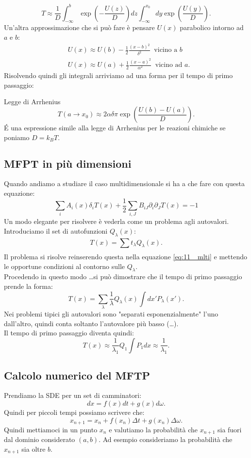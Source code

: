 \[
    T \approx \frac{1}{D}\int_{-\infty}^{b}\exp\left(-\frac{U(z)}{D}\right)dz \int_{-\infty}^{x_0} dy \exp\left(\frac{U(y)}{D}\right)
.\] 
Un'altra approssimazione che si può fare è pensare $U(x)$ parabolico intorno ad $a$ e $b$:
\[\begin{aligned}
    &U(x)  \approx U(b) - \frac{1}{2} \frac{\left(x-b\right)^2}{\delta^2} \ \text{  vicino a } b\\
    &U(x)  \approx U(a) + \frac{1}{2} \frac{\left(x-a\right)^2}{\alpha^2} \ \text{  vicino ad } a
.\end{aligned}\]
Risolvendo quindi gli integrali arriviamo ad una forma per il tempo di primo passaggio:
\begin{greenbox}{Legge di Arrhenius}
\[
    T(a\to x_0) \approx 2\alpha\delta\pi  \exp\left(\frac{U(b) - U(a) }{D}\right)
.\] 
\'E una espressione simile alla legge di Arrhenius per le reazioni chimiche se poniamo $D = k_BT$.
\end{greenbox}
\noindent
\subsection{MFPT in più dimensioni}%
\label{sub:MFPT in più dimensioni}
Quando andiamo a studiare il caso multidimensionale si ha a che fare con questa equazione:
\begin{equation}
    \sum_{i}^{} A_i(x) \delta_iT(x)+\frac{1}{2}\sum_{i,J}^{} B_{iJ}\partial_{i}\partial_{J}T(x) = -1
    \label{eq:11_ mlti}
\end{equation}
Un modo elegante per risolvere è vederla come un problema agli autovalori. \\
Introduciamo il set di autofunzioni $Q_\lambda (x)$:
\[
    T(x) = \sum_{}^{} t_\lambda Q_\lambda(x) 
.\] 
Il problema si risolve reinserendo questa nella equazione \ref{eq:11_ mlti} e mettendo le opportune condizioni al contorno sulle $Q_\lambda$.\\
Procedendo in questo modo \ldots si può dimostrare che il tempo di primo passaggio prende la forma:
\[
    T(x) = \sum_{\lambda}^{} \frac{1}{\lambda}Q_\lambda (x) \int dx' P_\lambda (x')  
.\] 
Nei problemi tipici gli autovalori sono "separati esponenzialmente" l'uno dall'altro, quindi conta soltanto l'autovalore più basso (\ldots).\\
Il tempo di primo passaggio diventa quindi:
\[
    T(x) \approx \frac{1}{\lambda_1}Q_1\int P_1dx \approx \frac{1}{\lambda_1}
.\] 
\subsection{Calcolo numerico del MFTP}%
\label{sub:Calcolo numerico del MFTP}
Prendiamo la SDE per un set di camminatori:
\[
    dx = f(x) dt + g(x) d\omega
.\] 
Quindi per piccoli tempi possiamo scrivere che:
\[
    x_{n+1} = x_n + f(x_n) \Delta t + g(x_n) \Delta\omega
.\] 
Quindi mettiamoci in un punto $x_n$ e valutiamo la probabilità che $x_{n+1}$ sia fuori dal dominio considerato $(a,b)$. Ad esempio consideriamo la probabilità che $x_{n+1}$ sia oltre $b$.


